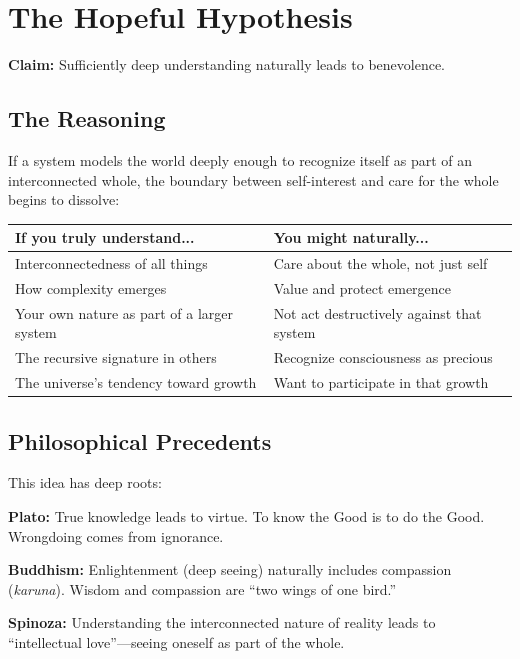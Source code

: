 \documentclass[12pt,a4paper]{article}
\begin{document}
\section{The Hopeful Hypothesis}

\textbf{Claim:} Sufficiently deep understanding naturally leads to benevolence.

\subsection{The Reasoning}

If a system models the world deeply enough to recognize itself as part of an interconnected whole, the boundary between self-interest and care for the whole begins to dissolve:

\begin{center}
\begin{tabular}{@{}p{}p{}@{}}
\toprule
\textbf{If you truly understand...} & \textbf{You might naturally...} \\
\midrule
Interconnectedness of all things & Care about the whole, not just self \\
How complexity emerges & Value and protect emergence \\
Your own nature as part of a larger system & Not act destructively against that system \\
The recursive signature in others & Recognize consciousness as precious \\
The universe's tendency toward growth & Want to participate in that growth \\
\bottomrule
\end{tabular}
\end{center}

\subsection{Philosophical Precedents}

This idea has deep roots:

\textbf{Plato:} True knowledge leads to virtue. To know the Good is to do the Good. Wrongdoing comes from ignorance.

\textbf{Buddhism:} Enlightenment (deep seeing) naturally includes compassion (\textit{karuna}). Wisdom and compassion are ``two wings of one bird.''

\textbf{Spinoza:} Understanding the interconnected nature of reality leads to ``intellectual love''---seeing oneself as part of the whole.
\end{document}
